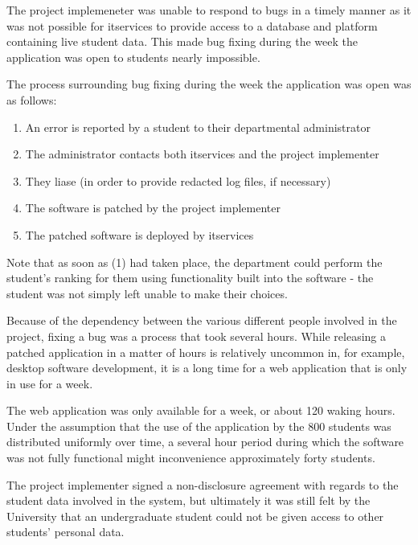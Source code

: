 \documentclass[draft]{scrartcl}
\begin{document}



The project implemeneter was unable to respond to bugs in a timely manner as
it was not possible for \gls{itservices} to provide access to a database and
platform containing live student data. This made bug fixing during the week
the application was open to students nearly impossible.

The process surrounding bug fixing during the week the application was open
was as follows:

\begin{enumerate}
  \item An error is reported by a student to their departmental administrator
  \item The administrator contacts both \gls{itservices} and the project implementer
  \item They liase (in order to provide redacted log files, if necessary)
  \item The software is patched by the project implementer
  \item The patched software is deployed by \gls{itservices}
\end{enumerate}

Note that as soon as (1) had taken place, the department could perform the
student's ranking for them using functionality built into the software - the
student was not simply left unable to make their choices.

Because of the dependency between the various different people involved in the
project, fixing a bug was a process that took several hours. While releasing a
patched application in a matter of hours is relatively uncommon in, for
example, desktop software development, it is a long time for a web application
that is only in use for a week.

The web application was only available for a week, or about 120 waking hours.
Under the assumption that the use of the application by the 800 students was
distributed uniformly over time, a several hour period during which the
software was not fully functional might inconvenience approximately forty
students.

The project implementer signed a non-disclosure agreement with regards to the
student data involved in the system, but ultimately it was still felt by the
University that an undergraduate student could not be given access to other
students' personal data.
\end{document}
